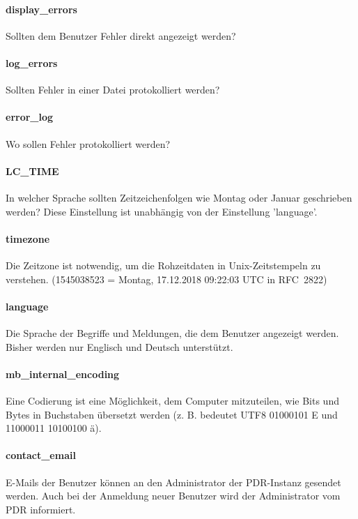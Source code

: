 \paragraph{display\_errors} Sollten dem Benutzer Fehler
direkt angezeigt werden? 

\paragraph{log\_errors} Sollten Fehler in einer
Datei protokolliert werden?

\paragraph{error\_log} Wo sollen Fehler
protokolliert werden? 

\paragraph{LC\_TIME} In welcher Sprache sollten
Zeitzeichenfolgen wie Montag oder Januar geschrieben werden? Diese
Einstellung ist unabhängig von der Einstellung
'language'.

\paragraph{timezone} Die Zeitzone ist notwendig, um die
Rohzeitdaten in Unix-Zeitstempeln zu verstehen. (1545038523 = Montag,
17.12.2018 09:22:03 UTC in RFC~2822)

\paragraph{language} Die Sprache der
Begriffe und Meldungen, die dem Benutzer angezeigt werden. Bisher werden nur
Englisch und Deutsch unterstützt.

\paragraph{mb\_internal\_encoding} Eine
Codierung ist eine Möglichkeit, dem Computer mitzuteilen, wie Bits und Bytes
in Buchstaben übersetzt werden (z. B. bedeutet UTF8 01000101 E und 11000011
10100100 ä).

\paragraph{contact\_email} E-Mails der Benutzer können an den
Administrator der PDR-Instanz gesendet werden. Auch bei der Anmeldung neuer Benutzer wird der Administrator vom PDR informiert.


